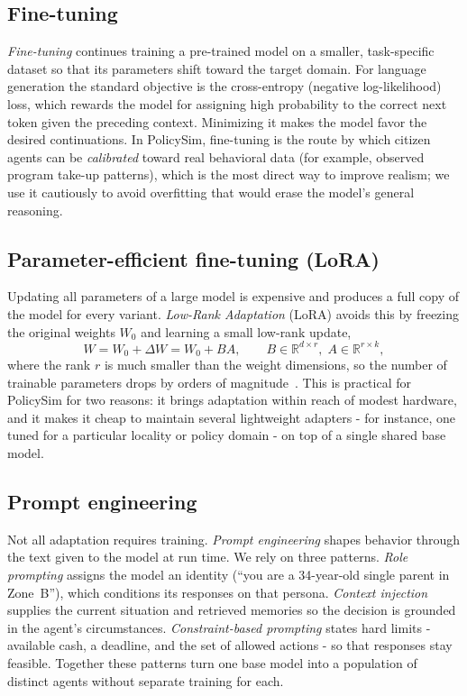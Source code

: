 \documentclass[conference]{IEEEtran}
\begin{document}
\subsection{Fine-tuning}
\emph{Fine-tuning} continues training a pre-trained model on a smaller, task-specific dataset so that its parameters shift toward the target domain. For language generation the standard objective is the cross-entropy (negative log-likelihood) loss, which rewards the model for assigning high probability to the correct next token given the preceding context. Minimizing it makes the model favor the desired continuations. In PolicySim, fine-tuning is the route by which citizen agents can be \emph{calibrated} toward real behavioral data (for example, observed program take-up patterns), which is the most direct way to improve realism; we use it cautiously to avoid overfitting that would erase the model's general reasoning.

\subsection{Parameter-efficient fine-tuning (LoRA)}
Updating all parameters of a large model is expensive and produces a full copy of the model for every variant. \emph{Low-Rank Adaptation} (LoRA) avoids this by freezing the original weights $W_0$ and learning a small low-rank update,
\begin{equation}
W = W_0 + \Delta W = W_0 + BA, \qquad B \in \mathbb{R}^{d\times r},\; A \in \mathbb{R}^{r\times k},
\end{equation}
where the rank $r$ is much smaller than the weight dimensions, so the number of trainable parameters drops by orders of magnitude~\cite{hu2022}. This is practical for PolicySim for two reasons: it brings adaptation within reach of modest hardware, and it makes it cheap to maintain several lightweight adapters - for instance, one tuned for a particular locality or policy domain - on top of a single shared base model.

\subsection{Prompt engineering}
Not all adaptation requires training. \emph{Prompt engineering} shapes behavior through the text given to the model at run time. We rely on three patterns. \emph{Role prompting} assigns the model an identity (``you are a 34-year-old single parent in Zone~B''), which conditions its responses on that persona. \emph{Context injection} supplies the current situation and retrieved memories so the decision is grounded in the agent's circumstances. \emph{Constraint-based prompting} states hard limits - available cash, a deadline, and the set of allowed actions - so that responses stay feasible. Together these patterns turn one base model into a population of distinct agents without separate training for each.
\end{document}
